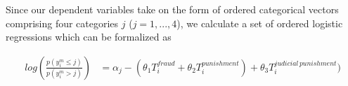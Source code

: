 \documentclass[11pt, ngerman,english,a4]{article}
\begin{document}

Since our dependent variables take on the form of ordered categorical vectors comprising four categories $j$ ($j=1,...,4$), we calculate a set of ordered logistic regressions which can be formalized as

\begin{equation}
 \begin{split}
log(\frac{p(y^{m}_i \leq j)}{p(y^{m}_i > j)}) & = \alpha_j - (\theta_1 T_i^{fraud} + \theta_2 T_i^{punishment}) + \theta_3 T_i^{judicial \, punishment}) \\
\end{split}
\end{equation}
\end{document}
